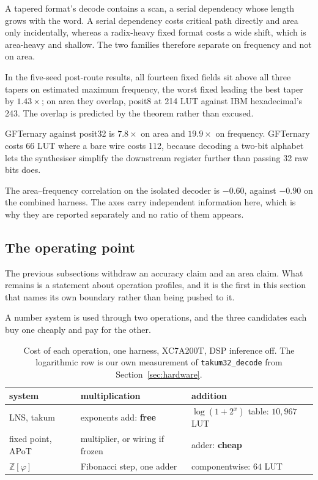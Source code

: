 \begin{theorem}
\label{thm:taperdelay}
A tapered format's decode contains a scan, a serial dependency whose length grows
with the word. A serial dependency costs critical path directly and area only
incidentally, whereas a radix-heavy fixed format costs a wide shift, which is
area-heavy and shallow. The two families therefore separate on frequency and not
on area.
\end{theorem}

In the five-seed post-route results, all fourteen fixed fields sit above all three tapers on estimated maximum frequency, the
worst fixed leading the best taper by $1.43\times$; on area they overlap, posit8
at 214 LUT against IBM hexadecimal's 243. The overlap is predicted by the theorem
rather than excused.

GFTernary against posit32 is $7.8\times$ on area and $19.9\times$ on frequency.
GFTernary costs 66 LUT where a bare wire costs 112, because decoding a two-bit
alphabet lets the synthesiser simplify the downstream register further than
passing 32 raw bits does.

The area--frequency correlation on the isolated decoder is $-0.60$, against
$-0.90$ on the combined harness. The axes carry independent information here,
which is why they are reported separately and no ratio of them appears.


\subsection{The operating point}

\label{sec:operatingpoint}

The previous subsections withdraw an accuracy claim and an area claim. What
remains is a statement about operation profiles, and it is the first in this
section that names its own boundary rather than being pushed to it.

A number system is used through two operations, and the three candidates each buy
one cheaply and pay for the other.

\begin{table}[t]\centering
\caption{Cost of each operation, one harness, XC7A200T, DSP inference off. The
logarithmic row is our own measurement of \texttt{takum32\_decode} from
Section~\ref{sec:hardware}.}
\label{tab:bothops}
\begin{tabular}{lll}
\toprule
system & multiplication & addition \\
\midrule
LNS, takum & exponents add: \textbf{free} & $\log(1{+}2^{x})$ table: $10{,}967$ LUT \\
fixed point, APoT & multiplier, or wiring if frozen & adder: \textbf{cheap} \\
$\mathbb{Z}[\varphi]$ & Fibonacci step, one adder & componentwise: $64$ LUT \\
\bottomrule
\end{tabular}
\end{table}

